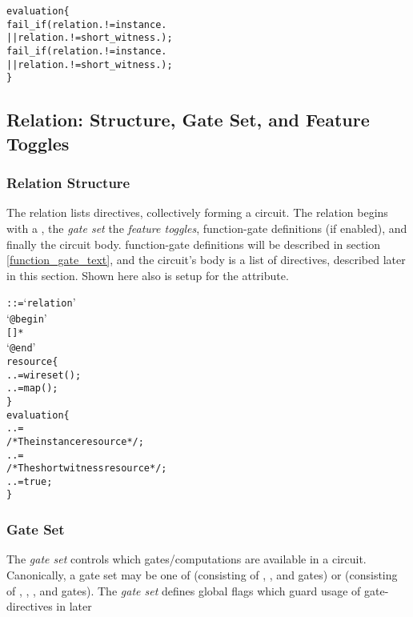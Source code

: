 \begin{alltt}
  evaluation \{
    fail_if(relation. != instance.
    || relation. != short_witness.);
    fail_if(relation. != instance.
      || relation. != short_witness.);
  \}
\end{alltt}

\subsection{Relation: Structure, Gate Set, and Feature Toggles}\label{structure_text}
\subsubsection*{Relation Structure}
The relation lists directives, collectively forming a circuit.
The relation begins with a , the \textit{gate set} the \textit{feature toggles}, function-gate definitions (if enabled), and finally the circuit body.
function-gate definitions will be described in section \ref{function_gate_text}, and the circuit's body is a list of directives, described later in this section.
Shown here also is setup for the  attribute.\\

\begin{alltt}\ttSyn
   ::=  `relation'
                  
                 `@begin'
                   [  ]*
                 `@end'\ttSem
  resource \{
    .. = wireset();
    .. = map();
  \}
  evaluation \{
    .. =
      /* The instance resource */;
    .. =
      /* The short witness resource */;
    .. = true;
  \}
\end{alltt}


\subsubsection*{Gate Set}
The \textit{gate set} controls which gates/computations are available in a circuit.
Canonically, a gate set may be one of  (consisting of , , and  gates) or  (consisting of , , , and  gates).
The \textit{gate set} defines global flags which guard usage of gate-directives in later \\

